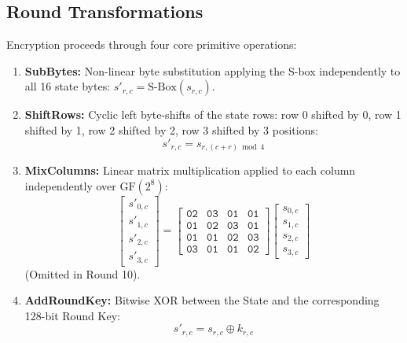 \subsection{Round Transformations}
Encryption proceeds through four core primitive operations:
\begin{enumerate}
    \item \textbf{SubBytes:} Non-linear byte substitution applying the S-box independently to all 16 state bytes: $s'_{r,c} = \text{S-Box}(s_{r,c})$.
    \item \textbf{ShiftRows:} Cyclic left byte-shifts of the state rows: row 0 shifted by 0, row 1 shifted by 1, row 2 shifted by 2, row 3 shifted by 3 positions:
    \begin{equation}
    s'_{r,c} = s_{r, (c + r) \bmod 4}
    \end{equation}
    \item \textbf{MixColumns:} Linear matrix multiplication applied to each column independently over $\text{GF}(2^8)$:
    \begin{equation}
    \begin{bmatrix} s'_{0,c} \\ s'_{1,c} \\ s'_{2,c} \\ s'_{3,c} \end{bmatrix}
    =
    \begin{bmatrix}
    \texttt{02} & \texttt{03} & \texttt{01} & \texttt{01} \\
    \texttt{01} & \texttt{02} & \texttt{03} & \texttt{01} \\
    \texttt{01} & \texttt{01} & \texttt{02} & \texttt{03} \\
    \texttt{03} & \texttt{01} & \texttt{01} & \texttt{02}
    \end{bmatrix}
    \begin{bmatrix} s_{0,c} \\ s_{1,c} \\ s_{2,c} \\ s_{3,c} \end{bmatrix}
    \end{equation}
    (Omitted in Round 10).
    \item \textbf{AddRoundKey:} Bitwise XOR between the State and the corresponding 128-bit Round Key:
    \begin{equation}
    s'_{r,c} = s_{r,c} \oplus k_{r,c}
    \end{equation}
\end{enumerate}

